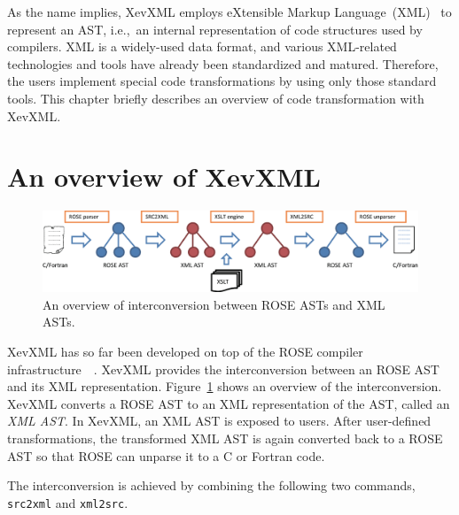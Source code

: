 As the name implies, XevXML employs eXtensible Markup
Language~(XML)~\cite{xml11} to represent an AST, i.e.,~an internal
representation of code structures used by compilers.  XML is a
widely-used data format, and various XML-related technologies and
tools have already been standardized and matured.  Therefore, the
users implement special code transformations by using only those
standard tools.  This chapter briefly describes an overview of code
transformation with XevXML.

\section{An overview of XevXML}
\begin{figure}[htb]
 \includegraphics[width=\textwidth]{overview.eps}
 \caption{An overview of interconversion between ROSE ASTs and XML
 ASTs.}\label{fig:overview}
\end{figure}

XevXML has so far been developed on top of the ROSE compiler
infrastructure~\cite{rose}~\cite{quinlan2000rose}.  XevXML provides
the interconversion between an ROSE AST and its XML
representation. Figure~\ref{fig:overview} shows an overview of the
interconversion.  XevXML converts a ROSE AST to an XML representation
of the AST, called an \emph{XML AST}. In XevXML, an XML AST is exposed
to users.  After user-defined transformations, the transformed XML AST
is again converted back to a ROSE AST so that ROSE can unparse it to a
C or Fortran code.

The interconversion is achieved by combining the following two commands,
\texttt{src2xml} and \texttt{xml2src}.

